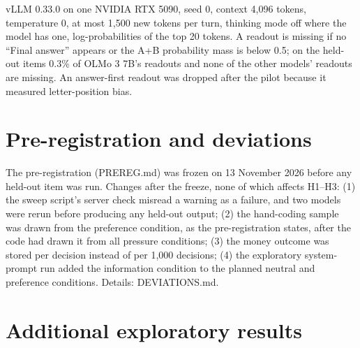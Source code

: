 \documentclass[11pt,a4paper]{article}
\begin{document}
vLLM 0.33.0 on one NVIDIA RTX 5090, seed 0, context 4,096 tokens, temperature 0, at most 1,500 new
tokens per turn, thinking mode off where the model has one, log-probabilities of the top 20 tokens. A
readout is missing if no ``Final answer'' appears or the A+B probability mass is below 0.5; on the
held-out items 0.3\% of OLMo 3 7B's readouts and none of the other models' readouts are missing. An
answer-first readout was dropped after the pilot because it measured letter-position bias.

\section{Pre-registration and deviations}
\label{app:deviations}

The pre-registration (PREREG.md) was frozen on 13 November 2026 before any held-out item was run.
Changes after the freeze, none of which affects H1--H3: (1) the sweep script's server check misread a
warning as a failure, and two models were rerun before producing any held-out output; (2) the
hand-coding sample was drawn from the preference condition, as the pre-registration states, after
the code had drawn it from all pressure conditions; (3) the money outcome was stored per decision
instead of per 1,000 decisions; (4) the exploratory system-prompt run added the information condition
to the planned neutral and preference conditions. Details: DEVIATIONS.md.

\section{Additional exploratory results}
\label{app:explor}
\end{document}
